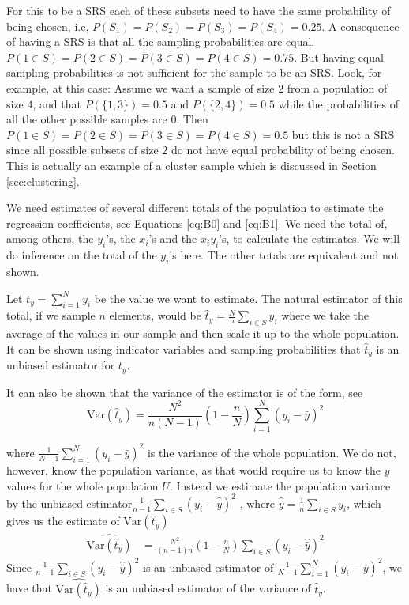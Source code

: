 \documentclass{article}
\begin{document}
For this to be a SRS each of these subsets need to have the same probability of
being chosen, i.e, \(P(S_1) = P(S_2) = P(S_3) = P(S_4) = 0.25\). A consequence of
having a SRS is that all the sampling probabilities are equal, \(P(1 \in S) =
P(2 \in S) = P(3 \in S) = P(4 \in S) = 0.75\). But having equal sampling
probabilities is not sufficient for the sample to be an SRS.
Look, for example, at this case:
Assume we want a sample of size \(2\) from a population of size \(4\), and that
\(P(\{1, 3\}) = 0.5\) and \(P(\{2, 4\}) = 0.5\) while the probabilities of all the
other possible samples are \(0\). Then \(P(1 \in S) = P(2 \in S) = P(3 \in S) = P(4 \in S) = 0.5\)
but this is not a SRS since all possible subsets of size \(2\) do not have equal
probability of being chosen. This is actually an example of a cluster sample
which is discussed in Section \ref{sec:clustering}.

We need estimates of several different totals of the population to estimate the
regression coefficients, see Equations \ref{eq:B0} and \ref{eq:B1}. We need the total of, among others, the \(y_i\)'s, the
\(x_i\)'s and the \(x_i y_i\)'s, to calculate the estimates.
We will do inference on the total of the \(y_i\)'s here. The other totals
are equivalent and not shown.

Let
\(
 t_y = \sum_{i = 1}^{N} y_i
\)
be the value we want to estimate.
The natural estimator of this total, if we sample \(n\) elements, would be
\(
\hat{t}_y = \frac{N}{n}\sum_{i \in S} y_i
\)
where we take the average of the values in our sample and then scale it up to
the whole population.
It can be shown using indicator variables and sampling probabilities that
\(\hat{t}_y\) is an unbiased estimator for \(t_y\).

It can also be shown that the variance of the estimator is of the form, see
\cite[Chapter 2]{sampReg} \begin{equation*}
\mathrm{Var} \left( \hat{t}_y \right) = \frac{N^2}{n \left( N - 1 \right)} \left( 1 - \frac{n}{N} \right) \sum_{i = 1}^N (y_i - \bar{y})^2 
\end{equation*}

where
\(
\frac{1}{N - 1} \sum_{i = 1}^N (y_i - \bar{y})^2
\)
is the variance of the whole population.
We do not, however, know the population variance, as that would require us to know the \(y\) values
for the whole population \(U\). Instead we estimate the population variance by the unbiased estimator\(
 \frac{1}{n - 1} \sum_{i \in S} \left( y_i - \hat{\bar{y}} \right)^2
\)
, where \(\hat{\bar{y}} = \frac{1}{n} \sum_{i \in S} y_i \), which gives us the estimate of \(\mathrm{Var}(\hat{t}_y)\)\begin{align*}
 \widehat{\mathrm{Var}(\hat{t}_y)}
 &=\frac{N^2}{\left( n - 1 \right)n} \left( 1 - \frac{n}{N} \right) \sum_{i \in S} \left( y_i - \hat{\bar{y}} \right)^2
\end{align*}
Since \(\frac{1}{n - 1} \sum_{i \in S} \left( y_i - \hat{\bar{y}} \right)^2\) is
an unbiased estimator of \(\frac{1}{N - 1} \sum_{i = 1}^N (y_i - \bar{y})^2\), we have that \(\widehat{\mathrm{Var}(\hat{t}_y)}\) is an unbiased estimator of the variance of \(\hat{t}_y\).
\end{document}
